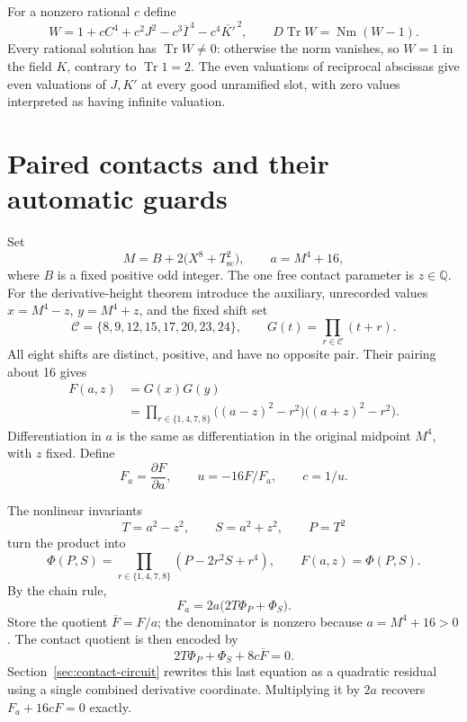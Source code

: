 \documentclass[11pt,a4paper]{article}
\newcommand{\Q}{\mathbb Q}\newcommand{\Z}{\mathbb Z}
\DeclareMathOperator{\Tr}{Tr}\DeclareMathOperator{\Nm}{Nm}
\begin{document}
For a nonzero rational $c$ define
\begin{equation}\label{eq:detector}
 W=1+cC^4+c^2J^2-c^3\overline I^{\,4}-c^4\overline{K'}^{\,2},
 \qquad D\Tr W=\Nm(W-1).
\end{equation}
Every rational solution has $\Tr W\ne0$: otherwise the norm vanishes,
so $W=1$ in the field $K$, contrary to $\Tr 1=2$.
The even valuations of reciprocal abscissas give even valuations of
$J,K'$ at every good unramified slot, with zero values interpreted as
having infinite valuation.

\section{Paired contacts and their automatic guards}

Set
\[
 M=B+2\bigl(X^8+T_{\mathrm{sc}}^2\bigr),\qquad
 a=M^4+16,
\]
where $B$ is a fixed positive odd integer. The one free contact parameter
is $z\in\Q$. For the derivative-height theorem introduce the auxiliary,
unrecorded values $x=M^4-z$, $y=M^4+z$, and the fixed shift set
\[
 \mathcal C=\{8,9,12,15,17,20,23,24\},\qquad
 G(t)=\prod_{r\in\mathcal C}(t+r).
\]
All eight shifts are distinct, positive, and have no opposite pair.
Their pairing about 16 gives
\begin{equation}\label{eq:contact-factorization}
 \begin{split}
 F(a,z)&=G(x)G(y)\\
 &=\prod_{r\in\{1,4,7,8\}}\bigl((a-z)^2-r^2\bigr)
                    \bigl((a+z)^2-r^2\bigr).
 \end{split}
\end{equation}
Differentiation in $a$ is the same as differentiation in the original
midpoint $M^4$, with $z$ fixed. Define
\begin{equation}\label{eq:derivative}
 F_a=\frac{\partial F}{\partial a},\qquad
                 u=-16F/F_a,\qquad c=1/u.
\end{equation}

The nonlinear invariants
\[
 T=a^2-z^2,\qquad S=a^2+z^2,\qquad P=T^2
\]
turn the product into
\[
 \Phi(P,S)=\prod_{r\in\{1,4,7,8\}}(P-2r^2S+r^4),\qquad F(a,z)=\Phi(P,S).
\]
By the chain rule,
\begin{equation}\label{eq:chain-rule}
 F_a=2a\bigl(2T\Phi_P+\Phi_S\bigr).
\end{equation}
Store the quotient $\overline F=F/a$; the denominator is nonzero because
$a=M^4+16>0$. The contact quotient is then encoded by
\begin{equation}\label{eq:new-quotient}
             2T\Phi_P+\Phi_S+8c\overline F=0.
\end{equation}
Section~\ref{sec:contact-circuit} rewrites this last equation as a
quadratic residual using a single combined derivative coordinate. Multiplying it by $2a$ recovers $F_a+16cF=0$ exactly.
\end{document}
